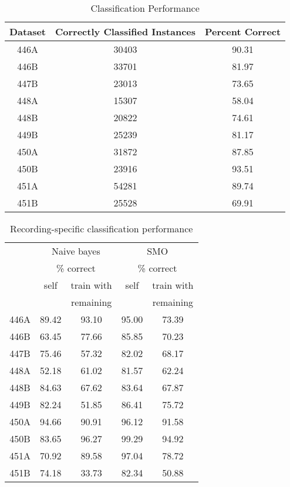 \begin{table}
\caption{Classification Performance}
\begin{tabular}{|c|c|c|} \hline

Dataset&Correctly Classified Instances&Percent Correct\\ \hline

446A & 30403 & 90.31\\ \hline
446B & 33701 & 81.97\\ \hline
447B & 23013 & 73.65\\ \hline
448A & 15307 & 58.04\\ \hline
448B & 20822 & 74.61\\ \hline
449B & 25239 & 81.17\\ \hline
450A & 31872 & 87.85\\ \hline
450B & 23916 & 93.51\\ \hline
451A & 54281 & 89.74\\ \hline
451B & 25528 & 69.91\\ \hline
\hline\end{tabular}
\end{table}



\begin{table}
\centering
\caption{Recording-specific classification performance}
\begin{tabular}{|c|c|c|c|c|} \hline

&\multicolumn{2}{|c|}{Naive bayes}&\multicolumn{2}{|c|}{SMO}\\
&\multicolumn{2}{|c|}{\% correct}&\multicolumn{2}{|c|}{\% correct}\\ \hline
&self&train with&self&train with\\
&&remaining&&remaining\\ \hline

446A  &  89.42  &  93.10  &  95.00  &  73.39\\ \hline
446B  &  63.45  &  77.66  &  85.85  &  70.23\\ \hline
447B  &  75.46  &  57.32  &  82.02  &  68.17\\ \hline
448A  &  52.18  &  61.02  &  81.57  &  62.24\\ \hline
448B  &  84.63  &  67.62  &  83.64  &  67.87\\ \hline
449B  &  82.24  &  51.85  &  86.41  &  75.72\\ \hline
450A  &  94.66  &  90.91  &  96.12  &  91.58\\ \hline
450B  &  83.65  &  96.27  &  99.29  &  94.92\\ \hline
451A  &  70.92  &  89.58  &  97.04  &  78.72\\ \hline
451B  &  74.18  &  33.73  &  82.34  &  50.88\\ \hline
\end{tabular}
\label{table:classification}
\end{table}


